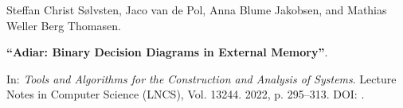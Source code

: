 Steffan Christ Sølvsten, Jaco van de Pol, Anna Blume Jakobsen, and Mathias Weller Berg Thomasen.

{\bf ``Adiar: Binary Decision Diagrams in External Memory''}.

In: \emph{Tools and Algorithms for the Construction and Analysis of Systems}.
Lecture Notes in Computer Science (LNCS), Vol. 13244. 2022, p. 295--313.
DOI: .

